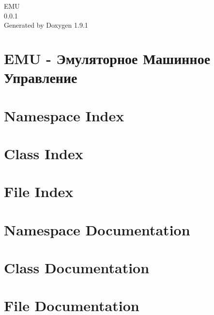 \let\mypdfximage\pdfximage\def\pdfximage{\immediate\mypdfximage}\documentclass[twoside]{book}
\newcommand{\+}{\discretionary{\mbox{\scriptsize$\hookleftarrow$}}{}{}}
\newcommand{\clearemptydoublepage}{%
  \newpage{\pagestyle{empty}\cleardoublepage}%
}
\begin{document}
\raggedbottom

\hypersetup{pageanchor=false,
             bookmarksnumbered=true,
             pdfencoding=unicode
            }
\begin{titlepage}
\vspace*{7cm}
\begin{center}%
{\Large EMU \\[1ex]\large 0.\+0.\+1 }\\
\vspace*{1cm}
{\large Generated by Doxygen 1.9.1}\\
\end{center}
\end{titlepage}
\clearemptydoublepage
{}
\tableofcontents
\clearemptydoublepage
{}
\hypersetup{pageanchor=true}

\chapter{EMU -\/ Эмуляторное Машинное Управление}
\label{md__home_leon__projects_processor_emulator__e_m_u__m_a_i_n}

\chapter{Namespace Index}

\chapter{Class Index}

\chapter{File Index}

\chapter{Namespace Documentation}

\chapter{Class Documentation}

\chapter{File Documentation}






\backmatter
\newpage
{}
\clearemptydoublepage
{}
\printindex
\end{document}
